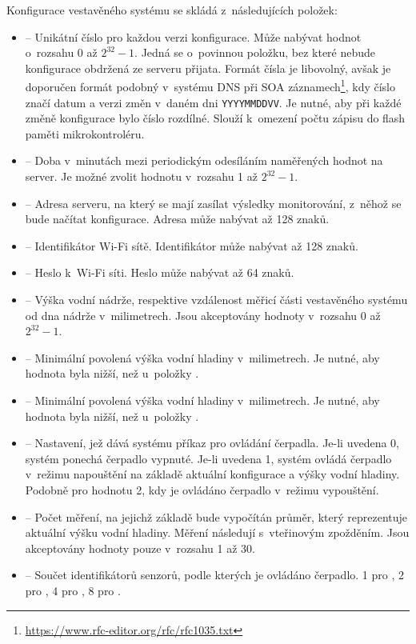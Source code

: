         Konfigurace vestavěného systému se skládá z~následujících položek:
        \begin{itemize}
            \item {} -- Unikátní číslo pro každou verzi konfigurace. Může nabývat hodnot o~rozsahu 0 až $2^{32}-1$. Jedná se o~povinnou položku, bez které nebude konfigurace obdržená ze serveru přijata. Formát čísla je libovolný, avšak je doporučen formát podobný  v~systému DNS při SOA záznamech\footnote{\url{https://www.rfc-editor.org/rfc/rfc1035.txt}}, kdy číslo značí datum a verzi změn v~daném dni \texttt{YYYYMMDDVV}. Je nutné, aby při každé změně konfigurace bylo číslo rozdílné. Slouží k~omezení počtu zápisu do flash paměti mikrokontroléru.
            \item {} -- Doba v~minutách mezi periodickým odesíláním naměřených hodnot na server. Je možné zvolit hodnotu v~rozsahu 1 až $2^{32}-1$.
            \item {} -- Adresa serveru, na který se mají zasílat výsledky monitorování, z~něhož se bude načítat konfigurace. Adresa může nabývat až 128 znaků.
            \item {} -- Identifikátor Wi-Fi sítě. Identifikátor může nabývat až 128 znaků.
            \item {} -- Heslo k~Wi-Fi síti. Heslo může nabývat až 64 znaků.
            \item {} -- Výška vodní nádrže, respektive vzdálenost měřicí části vestavěného systému od dna nádrže v~milimetrech. Jsou akceptovány hodnoty v~rozsahu 0 až $2^{32}-1$.
            \item {} -- Minimální povolená výška vodní hladiny v~milimetrech. Je nutné, aby hodnota byla nižší, než u~položky .
            \item {} -- Minimální povolená výška vodní hladiny v~milimetrech. Je nutné, aby hodnota byla nižší, než u~položky .
            \item {} -- Nastavení, jež dává systému příkaz pro ovládání čerpadla. Je-li uvedena 0, systém ponechá čerpadlo vypnuté. Je-li uvedena 1, systém ovládá čerpadlo v~režimu napouštění na základě aktuální konfigurace a výšky vodní hladiny. Podobně pro hodnotu 2, kdy je ovládáno čerpadlo v~režimu vypouštění.
            \item {} -- Počet měření, na jejichž základě bude vypočítán průměr, který reprezentuje aktuální výšku vodní hladiny. Měření následují s~vteřinovým zpožděním. Jsou akceptovány hodnoty pouze v~rozsahu 1 až 30.
            \item {} -- Součet identifikátorů senzorů, podle kterých je ovládáno čerpadlo. 1 pro , 2 pro , 4 pro , 8 pro .
        \end{itemize}

